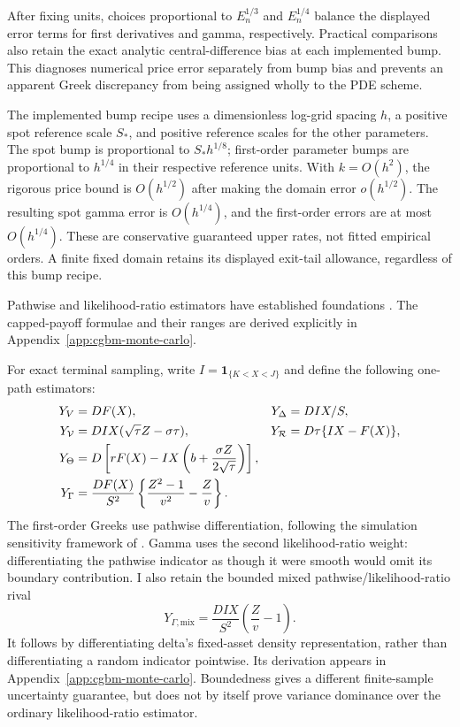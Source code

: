 \documentclass[11pt]{article}
\begin{document}
After fixing units, choices proportional to $E_n^{1/3}$ and $E_n^{1/4}$
balance the displayed error terms for first derivatives and gamma,
respectively. Practical comparisons also retain the exact analytic
central-difference bias at each implemented bump. This diagnoses numerical
price error separately from bump bias and prevents an apparent Greek
discrepancy from being assigned wholly to the PDE scheme.

The implemented bump recipe uses a dimensionless log-grid spacing $h$,
a positive spot reference scale $S_*$, and positive reference scales for
the other parameters. The spot bump is proportional to $S_*h^{1/8}$;
first-order parameter bumps are proportional to $h^{1/4}$ in their
respective reference units. With $k=O(h^2)$, the rigorous price bound is
$O(h^{1/2})$ after making the domain error $o(h^{1/2})$. The resulting
spot gamma error is $O(h^{1/4})$, and the first-order errors are at most
$O(h^{1/4})$. These are conservative guaranteed upper rates, not fitted
empirical orders. A finite fixed domain retains its displayed exit-tail
allowance, regardless of this bump recipe.

Pathwise and likelihood-ratio estimators have established foundations
\citep{broadieglasserman1996}. The capped-payoff formulae and their ranges
are derived explicitly in Appendix~\ref{app:cgbm-monte-carlo}.

For exact terminal sampling, write $I=\mathbf 1_{\{K<X<J\}}$ and
define the following one-path estimators:
\begin{align}
 Y_V&=D F(X),
 &Y_\Delta&=D I X/S,\notag\\
 Y_{\mathcal V}&=D I X(\sqrt{\tau}Z-\sigma\tau),
 &Y_{\mathcal R}&=D\tau\{IX-F(X)\},
 \label{eq:cgbm-pw-estimators}\\
 Y_\Theta&=D\left[rF(X)-IX
 \left(b+\frac{\sigma Z}{2\sqrt{\tau}}\right)\right],
 \label{eq:cgbm-theta-estimator}\\
 Y_\Gamma&=\frac{D F(X)}{S^2}
 \left\{\frac{Z^2-1}{v^2}-\frac{Z}{v}\right\}.
 \label{eq:cgbm-lr-estimator}
\end{align}
The first-order Greeks use pathwise differentiation, following the
simulation sensitivity framework of \citet{broadieglasserman1996}.
Gamma uses the
second likelihood-ratio weight: differentiating the pathwise indicator
as though it were smooth would omit its boundary contribution.
I also retain the bounded mixed pathwise/likelihood-ratio rival
\begin{equation}
 Y_{\Gamma,\mathrm{mix}}
 =\frac{D I X}{S^2}\left(\frac{Z}{v}-1\right).
 \label{eq:cgbm-mixed-gamma}
\end{equation}
It follows by differentiating delta's fixed-asset density representation,
rather than differentiating a random indicator pointwise. Its derivation
appears in Appendix~\ref{app:cgbm-monte-carlo}. Boundedness gives a
different finite-sample uncertainty guarantee, but does not by itself
prove variance dominance over the ordinary likelihood-ratio estimator.
\end{document}
